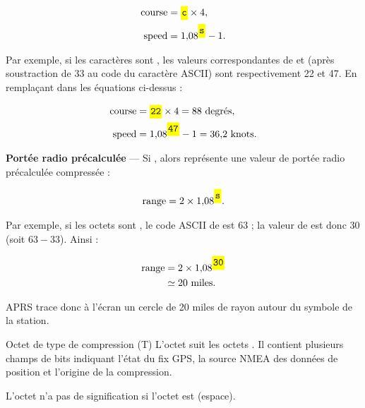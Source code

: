 \endgroup

\begin{aprsbodyblock}
\begin{align*}
\mathrm{course} &= \lit{c}\times4, \\
\mathrm{speed}  &= 1{,}08^{\lit{s}}-1.
\end{align*}

Par exemple, si les caractères  sont , les valeurs
correspondantes de  et  (après soustraction de 33 au code du
caractère ASCII) sont respectivement 22 et 47. En remplaçant dans les équations
ci-dessus :

\begin{align*}
\mathrm{course} &= \lit{22}\times4=88\ \text{degrés}, \\
\mathrm{speed}  &= 1{,}08^{\lit{47}}-1=36{,}2\ \text{knots}.
\end{align*}

\textbf{Portée radio précalculée} --- Si \lit{\{}, alors
 représente une valeur de portée radio précalculée compressée :

\begin{align*}
\mathrm{range}=2\times1{,}08^{\lit{s}}.
\end{align*}

Par exemple, si les octets  sont , le code ASCII
de  est 63 ; la valeur de  est donc 30 (soit $63-33$). Ainsi :

\begin{align*}
\mathrm{range} &= 2\times1{,}08^{\lit{30}} \\
               &\simeq 20\ \text{miles}.
\end{align*}

APRS trace donc à l'écran un cercle de 20 miles de rayon autour du symbole de
la station.
\end{aprsbodyblock}

\begin{aprssideblock}{Octet de type de compression (T)}
L'octet  suit les octets . Il contient
plusieurs champs de bits indiquant l'état du fix GPS, la source NMEA des
données de position et l'origine de la compression.

L'octet  n'a pas de signification si l'octet
 est \lit{~} (espace).
\end{aprssideblock}

